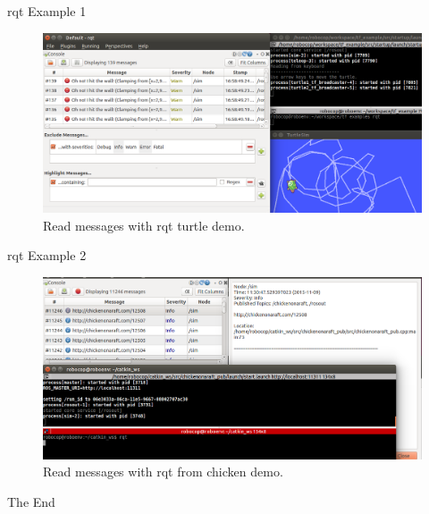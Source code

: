 \documentclass{beamer}
\begin{document}
\begin{frame}{rqt Example 1}
\begin{figure}[p]
	\centering
	\includegraphics[width=1\textwidth]{./images/rqt.png}
	\caption{Read messages with rqt turtle demo.}
	\label{fig::rqt_1}
\end{figure}
\end{frame}
\begin{frame}{rqt Example 2}
	\begin{figure}[p]
		\centering
		\includegraphics[width=1\textwidth]{./images/chickenrqt.png}
		\caption{Read messages with rqt from chicken demo.}
		\label{fig::rqt_2}
	\end{figure}
\end{frame}
\begin{frame}
\Huge{\centerline{The End}}
\end{frame}
\end{document}

